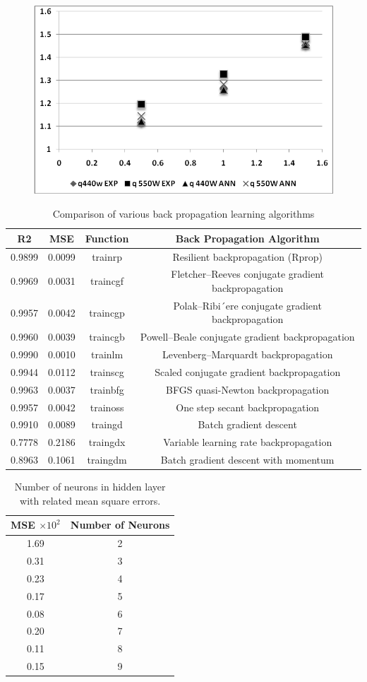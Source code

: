 \documentclass{article}
\begin{document}
\begin{figure}
	\centering
	\includegraphics[width=0.7\linewidth]{fig9}
	\caption{}
	\label{fig:fig9}
\end{figure}


\begin{table}[htbp]
	\centering
	\caption{Comparison of various back propagation learning algorithms}
	\begin{tabular}{cccc}
		\hline
		R2 & MSE & Function & Back Propagation Algorithm \\
		\hline
		0.9899 & 0.0099 & trainrp & Resilient backpropagation (Rprop) \\
		0.9969 & 0.0031 & traincgf & Fletcher–Reeves conjugate gradient backpropagation \\
		0.9957 & 0.0042 & traincgp & Polak–Ribi´ere conjugate gradient backpropagation \\
		0.9960 & 0.0039 & traincgb & Powell–Beale conjugate gradient backpropagation \\
		0.9990 & 0.0010 & trainlm & Levenberg–Marquardt backpropagation \\
		0.9944 & 0.0112 & trainscg & Scaled conjugate gradient backpropagation \\
		0.9963 & 0.0037 & trainbfg & BFGS quasi-Newton backpropagation \\
		0.9957 & 0.0042 & trainoss & One step secant backpropagation \\
		0.9910 & 0.0089 & traingd & Batch gradient descent \\
		0.7778 & 0.2186 & traingdx & Variable learning rate backpropagation \\
		0.8963 & 0.1061 & traingdm & Batch gradient descent with momentum \\
		\hline
	\end{tabular}
\end{table}


\begin{table}[htbp]
	\centering
	\caption{Number of neurons in hidden layer with related mean square errors.}
	\begin{tabular}{cc}
		\hline
		MSE $\times 10^2$ & Number of Neurons \\
		\hline
		1.69 & 2 \\
		0.31 & 3 \\
		0.23 & 4 \\
		0.17 & 5 \\
		0.08 & 6 \\
		0.20 & 7 \\
		0.11 & 8 \\
		0.15 & 9 \\
		\hline
	\end{tabular}
\end{table}
\end{document}

